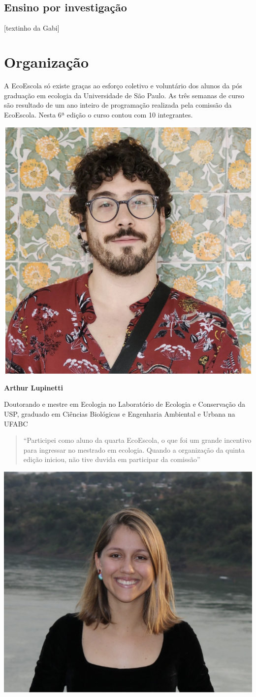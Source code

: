 \documentclass[
]{book}
\begin{document}
\section{Ensino por investigação}\label{ensino-por-investigauxe7uxe3o}

{[}textinho da Gabi{]}

\chapter{Organização}\label{organizauxe7uxe3o}

A EcoEscola só existe graças ao esforço coletivo e voluntário dos alunos da pós graduação em ecologia da Universidade de São Paulo. As três semanas de curso são resultado de um ano inteiro de programação realizada pela comissão da EcoEscola. Nesta 6ª edição o curso contou com 10 integrantes.

\begin{center}\includegraphics[width=0.5\linewidth]{figs/arthur_picture} \end{center}

\textbf{Arthur Lupinetti}

Doutorando e mestre em Ecologia no Laboratório de Ecologia e Conservação da USP, graduado em Ciências Biológicas e Engenharia Ambiental e Urbana na UFABC

\begin{quote}
``Participei como aluno da quarta EcoEscola, o que foi um grande incentivo para ingressar no mestrado em ecologia. Quando a organização da quinta edição iniciou, não tive duvida em participar da comissão''
\end{quote}

\begin{center}\includegraphics[width=0.5\linewidth]{figs/bianca_picture} \end{center}
\end{document}

